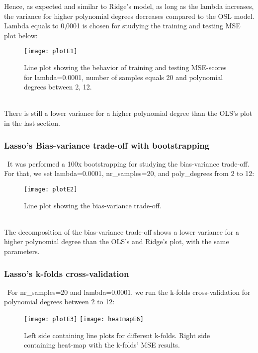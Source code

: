 Hence, as expected and similar to Ridge's model, as long as the lambda increases, the variance for higher polynomial degrees decreases compared to the OSL model. \\

Lambda equals to 0,0001 is chosen for studying the training and testing MSE plot below: \\

\begin{figure}[H]
\label{fig:plotE1}
\centering
\texttt{[image: plotE1]}
\caption{Line plot showing the behavior of training and testing MSE-scores for lambda=0.0001, number of samples equals 20 and polynomial degrees between 2, 12.}
\end{figure}\\

There is still a lower variance for a higher polynomial degree than the OLS's plot in the last section.

\subsubsection{Lasso's Bias-variance trade-off with bootstrapping}
\label{chap:Lasso's Bias-variance trade-off with bootstrapping}

\quad \, It was performed a 100x bootstrapping for studying the bias-variance trade-off. For that, we set lambda=0.0001, nr\_samples=20, and poly\_degrees from 2 to 12:

\begin{figure}[H]
\label{fig:BiasplotE2}
\centering
\texttt{[image: plotE2]}
\caption{Line plot showing the bias-variance trade-off.}
\end{figure}\\

The decomposition of the bias-variance trade-off shows a lower variance for a higher polynomial degree than the OLS's and Ridge's plot, with the same parameters. \\

\subsubsection{Lasso's k-folds cross-validation}
\label{chap:Lasso's k-folds cross-validation}

\quad \, For nr\_samples=20 and lambda=0,0001, we run the k-folds cross-validation for polynomial degrees between 2 to 12:

\begin{figure}[H]
\label{fig:plotE3andh6}
\centering
\texttt{[image: plotE3]}
\texttt{[image: heatmapE6]}
\caption{Left side containing line plots for different k-folds. Right side containing heat-map with the k-folds' MSE results.}
\end{figure}\\

